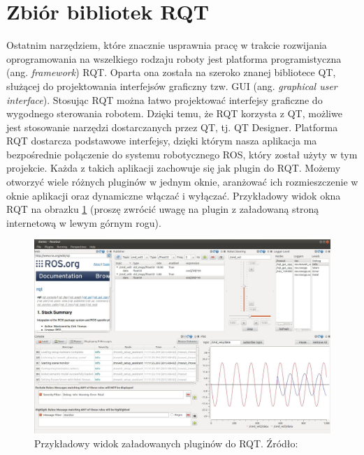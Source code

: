 \section{Zbiór bibliotek RQT}
Ostatnim narzędziem, które znacznie usprawnia pracę w trakcie rozwijania oprogramowania
na wszelkiego rodzaju roboty jest platforma programistyczna (ang. \textit{framework}) RQT.
Oparta ona została na szeroko znanej bibliotece QT, służącej do projektowania interfejsów
graficzny tzw. GUI (ang. \textit{graphical user interface}). Stosując RQT można łatwo
projektować interfejsy graficzne do wygodnego sterowania robotem. Dzięki temu, że RQT
korzysta z QT, możliwe jest stosowanie narzędzi dostarczanych przez QT, tj. QT Designer.
Platforma RQT dostarcza podstawowe interfejsy, dzięki którym nasza aplikacja ma bezpośrednie
połączenie do systemu robotycznego ROS, który został użyty w tym projekcie. Każda z takich
aplikacji zachowuje się jak plugin do RQT. Możemy otworzyć wiele różnych pluginów
w jednym oknie, aranżować ich rozmieszczenie w oknie aplikacji oraz dynamiczne
włączać i wyłączać. Przykładowy widok okna RQT na obrazku \ref{fig:rqtsample} (proszę
zwrócić uwagę na plugin z załadowaną stroną internetową w lewym górnym rogu).

\begin{figure}[H]
	\centering
	\includegraphics[width=0.8\linewidth]{rozdzial5/images/rqt_sample}
	\caption{Przykładowy widok załadowanych pluginów do RQT. Źródło: \cite{rqt}}
	\label{fig:rqtsample}
\end{figure}

